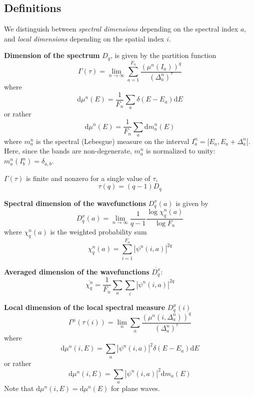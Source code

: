 \documentclass[11pt]{article}
\renewcommand{\d}[1]{\mathrm{d}#1}
\begin{document}
\subsection{Definitions}

We distinguish between \emph{spectral dimensions} depending on the spectral index $a$, and \emph{local dimensions} depending on the spatial index $i$.

\textbf{Dimension of the spectrum} $\boxed{D_q}$, is given by the partition function
\begin{equation}
	\Gamma(\tau) = \lim_{n\rightarrow \infty} \sum_{a=1}^{F_n} \frac{(\mu^n(I_a))^q}{(\Delta_a^n)^\tau}
\end{equation}
where
\begin{equation}
	\d \mu^n(E) = \frac{1}{F_n}\sum_a \delta(E-E_a) \d E
\end{equation}
or rather
\begin{equation}
	\d \mu^n(E) = \frac{1}{F_n}\sum_a \d{m_a^n}(E)
\end{equation}
where $m_a^n$ is the spectral (Lebesgue) measure on the interval $I_a^n = [E_a,E_a+\Delta_a^n[$.
Here, since the bands are non-degenerate, $m_a^n$ is normalized to unity: $m_a^n(I_b^n)=\delta_{a,b}$.

$\Gamma(\tau)$ is finite and nonzero for a single value of $\tau$, 
\begin{equation}
	\tau(q) = (q-1)D_q
\end{equation}

\textbf{Spectral dimension of the wavefunctions} $\boxed{D^x_q(a)}$ is given by
\begin{equation}
	D^x_q(a) = \lim_{n\rightarrow \infty} \frac{1}{q-1} \frac{\log \chi^n_q(a)}{\log F_n}
\end{equation}
where $\chi^n_q(a)$ is the weighted probability sum
\begin{equation}
	\chi^n_q(a) = \sum_{i=1}^{F_n} |\psi^n(i,a)|^{2q}
\end{equation}

\textbf{Averaged dimension of the wavefunctions} $\boxed{\overline{D^x_q}}$:
\begin{equation}
	\overline{\chi^n_q} = \frac{1}{F_n}\sum_a \sum_i |\psi^n(i,a)|^{2q}
\end{equation}

\textbf{Local dimension of the local spectral measure} $\boxed{D^\mu_q(i)}$
\begin{equation}
	\Gamma^\mu(\tau(i)) = \lim_n \sum_a \frac{\left(\mu^n(i,\Delta_a^n)\right)^q}{(\Delta_a^n)^\tau}
\end{equation}
where
\begin{equation}
	\d \mu^n(i,E) = \sum_a |\psi^n(i,a)|^2 \delta(E-E_a) \d E
\end{equation}
or rather
\begin{equation}
	\d \mu^n(i,E) = \sum_a |\psi^n(i,a)|^2 \d{m_a}(E)
\end{equation}
Note that $\d \mu^n(i,E) = \d \mu^n(E)$ for plane waves.
\end{document}
